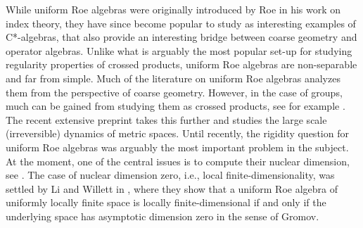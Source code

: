 \documentclass[12pt, a4paper, oneside]{amsart}
\newcommand{\0}{\mathbf{0}}
\newcommand{\1}{\mathbf{1}}
\begin{document}
	 While uniform Roe algebras were originally introduced by Roe in his work on index theory, they have since become popular to study as interesting examples of C*-algebras, that also provide an interesting bridge between coarse geometry and operator algebras. Unlike what is arguably the most popular set-up for studying regularity properties of crossed products, uniform Roe algebras are non-separable and far from simple. Much of the literature on uniform Roe algebras analyzes them from the perspective of coarse geometry. However, in the case of groups, much can be gained from studying them as crossed products, see for example \cite{kellerhals}. The recent extensive preprint \cite{braga2026} takes this further and studies the large scale (irreversible) dynamics of metric spaces. Until recently, the rigidity question for uniform Roe algebras was arguably the most important problem in the subject. At the moment, one of the central issues is to compute their nuclear dimension, see \cite[Problem LXXXVII]{99prob}. The case of nuclear dimension zero, i.e., local finite-dimensionality, was settled by Li and Willett in \cite{li2018low}, where they show that a uniform Roe algebra of uniformly locally finite space is locally finite-dimensional if and only if the underlying space has asymptotic dimension zero in the sense of Gromov. 
	 
\end{document}
